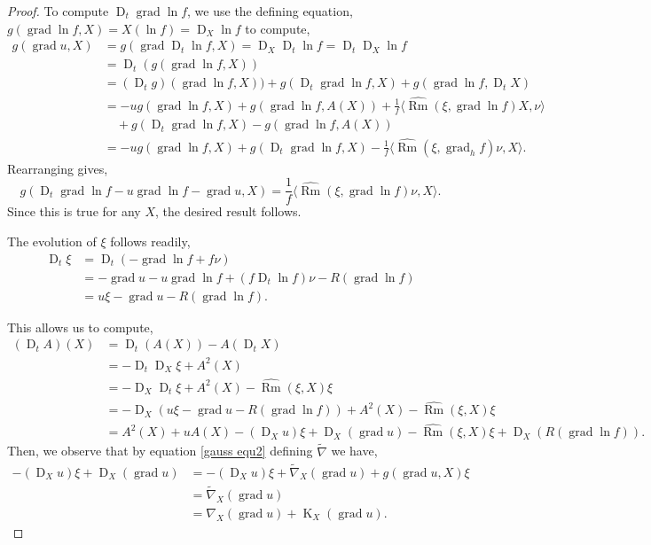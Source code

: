 \documentclass{amsart}
\theoremstyle{definition}
\theoremstyle{remark}
\newcommand{\ip}[2]{\ensuremath{\langle{#1},{#2}\rangle}}
\DeclareMathOperator{\grad}{grad}
\DeclareMathOperator{\Rm}{Rm}
\DeclareMathOperator{\diff}{K}
\DeclareMathOperator{\D}{D}
\numberwithin{equation}{section}
\begin{document}
\begin{proof}
To compute $\D_t \grad \ln f$, we use the defining equation, $g(\grad \ln f, X) = X(\ln f) = \D_X \ln f$ to compute,
\[
\begin{split}
g(\grad u, X) &= g(\grad \D_t \ln f, X) = \D_X \D_t \ln f = \D_t \D_X \ln f \\
&=  \D_t (g(\grad \ln f, X)) \\
&= (\D_t g) (\grad \ln f, X)) + g(\D_t \grad \ln f, X) + g(\grad \ln f, \D_t X) \\
&= -ug(\grad\ln f, X) + g(\grad \ln f, A(X)) + \frac{1}{f}\ip{\widehat{\Rm}(\xi, \grad \ln f)X}{\nu} \\
&\quad  + g(\D_t \grad \ln f, X) - g(\grad \ln f, A(X)) \\
&= - u g(\grad \ln f, X) + g(\D_t \grad \ln f, X) - \frac{1}{f} \ip{\widehat{\Rm}(\xi, \grad_h f)\nu}{X}.
\end{split}
\]
Rearranging gives,
\[
g(\D_t \grad \ln f - u \grad\ln f - \grad u, X) = \frac{1}{f} \ip{\widehat{\Rm}(\xi, \grad \ln f) \nu}{X}.
\]
Since this is true for any $X$, the desired result follows.

The evolution of $\xi$ follows readily,
\[
\begin{split}
\D_t \xi &= \D_t (-\grad \ln f + f \nu) \\
& = -\grad u - u \grad \ln f + (f \D_t \ln f) \nu - R(\grad \ln f) \\
&= u\xi - \grad u - R(\grad \ln f).
\end{split}
\]

This allows us to compute,
\[
\begin{split}
(\D_t A)(X) &= \D_t (A(X)) - A(\D_t X) \\
&= - \D_t \D_X \xi + A^2(X) \\
&= -\D_X \D_t \xi + A^2(X) - \widehat{\Rm} (\xi, X) \xi \\
&= -\D_X \left(u\xi - \grad u - R(\grad \ln f)\right) + A^2(X) - \widehat{\Rm} (\xi, X) \xi \\
&= A^2(X) + u A(X) -(\D_X u)\xi + \D_X (\grad u) - \widehat{\Rm} (\xi, X) \xi + \D_X (R(\grad \ln f)).
\end{split}
\]
Then, we observe that by equation \eqref{gauss equ2} defining $\tilde{\nabla}$ we have,
\[
\begin{split}
-(\D_X u)\xi + \D_X (\grad u) &= -(\D_X u)\xi + \tilde{\nabla}_X (\grad u) + g(\grad u, X) \xi \\
&= \tilde{\nabla}_X (\grad u) \\
&= \nabla_X (\grad u) + \diff_X (\grad u).
\end{split}
\]


\end{proof}
\end{document}
